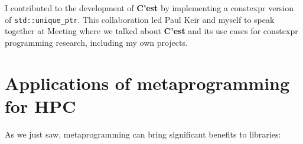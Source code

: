 \documentclass[../main]{subfiles}
\begin{document}
I contributed to the development of \textbf{C'est} by implementing a \gls{constexpr}
version of \lstinline{std::unique_ptr}. This collaboration led Paul Keir
and myself to speak together at Meeting  \cite{meetingcpp22}
where we talked about \textbf{C'est} and its use cases for \gls{constexpr}
programming research, including my own projects.

%
%
%
%
%

\section{
  Applications of metaprogramming for HPC
}

As we just saw, metaprogramming can bring significant benefits to libraries:
\end{document}
